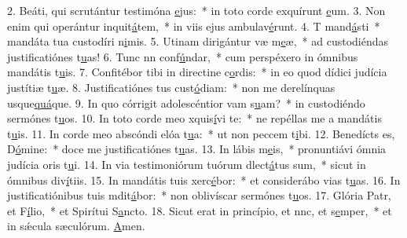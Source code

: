 2. Beáti, qui scrutántur testimóna \uline{e}jus:~* in toto corde exquírunt \uline{e}um.
3. Non enim qui operántur inquit\uline{á}tem,~* in viis ejus ambulav\uline{é}runt.
4. T mand\uline{á}sti~* mandáta tua custodíri n\uline{i}mis.
5. Utinam dirigántur væ m\uline{e}æ,~* ad custodiéndas justificatiónes t\uline{u}as!
6. Tunc nn conf\uline{ú}ndar,~* cum perspéxero in ómnibus mandátis t\uline{u}is.
7. Confitébor tibi in directine c\uline{o}rdis:~* in eo quod dídici judícia justítiæ t\uline{u}æ.
8. Justificatiónes tus cust\uline{ó}diam:~* non me derelínquas usque\uline{quá}que.
9. In quo córrigit adolescéntior vam s\uline{u}am?~* in custodiéndo sermónes t\uline{u}os.
10. In toto corde meo xquis\uline{í}vi te:~* ne repéllas me a mandátis t\uline{u}is.
11. In corde meo abscóndi elóa t\uline{u}a:~* ut non peccem t\uline{i}bi.
12. Benedícts es, D\uline{ó}mine:~* doce me justificatiónes t\uline{u}as.
13. In lábis m\uline{e}is,~* pronuntiávi ómnia judícia oris t\uline{u}i.
14. In via testimoniórum tuórum dlect\uline{á}tus sum,~* sicut in ómnibus div\uline{í}tiis.
15. In mandátis tuis xerc\uline{é}bor:~* et considerábo vias t\uline{u}as.
16. In justificatiónibus tuis mdit\uline{á}bor:~* non oblivíscar sermónes t\uline{u}os.
17. Glória Patr, et F\uline{í}lio,~* et Spirítui S\uline{a}ncto.
18. Sicut erat in princípio, et nnc, et s\uline{e}mper,~* et in sǽcula sæculórum. \uline{A}men.
